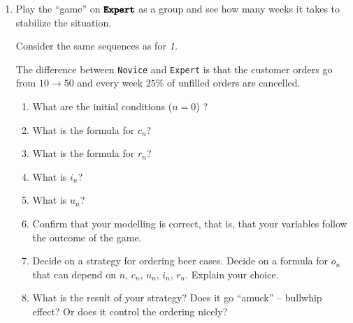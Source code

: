 \begin{enumerate}[label = \emph{\arabic*.}]
\begin{enumerate}[label = \emph{(\alph*)}]
\end{enumerate}


\newpage

\item Play the ``game'' on $\pmb{\tt Expert}$ as a group and see how many weeks it takes to stabilize the situation.

Consider the same sequences as for \emph{1.} 

The difference between {\tt Novice} and {\tt Expert} is that the customer orders go from $10\to50$ and every week $25\%$ of unfilled orders are cancelled.

\begin{enumerate}[label = \emph{(\alph*)}]
\item What are the initial conditions ($n=0$) ?
\item What is the formula for $c_n$?


\item What is the formula for $r_n$? 


\item What is $i_n$?

\item What is $u_n$?


\item Confirm that your modelling is correct, that is, that your variables follow the outcome of the game.

\item Decide on a strategy for ordering beer cases. Decide on a formula for $o_n$ that can depend on $n$, $c_n$, $u_n$, $i_n$, $r_n$.
Explain your choice.


\item What is the result of your strategy? Does it go ``amuck'' -- bullwhip effect? Or does it control the ordering nicely?


\end{enumerate}

\end{enumerate}




\vfill

